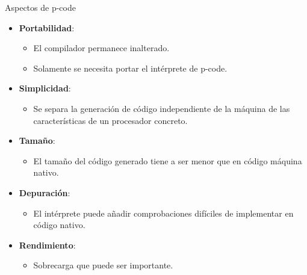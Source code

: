 \begin{frame}[t]{Aspectos de p-code}
  \begin{itemize}
    \item \textbf{\color{blue}Portabilidad}:
      \begin{itemize}
        \item El compilador permanece inalterado.
        \item Solamente se necesita portar el intérprete de p-code.
      \end{itemize}
    \item \textbf{\color{blue}Simplicidad}:
      \begin{itemize}
        \item Se separa la generación de código independiente de la máquina de las características de un procesador concreto.
      \end{itemize}
    \item \textbf{\color{blue}Tamaño}:
      \begin{itemize}
        \item El tamaño del código generado tiene a ser menor que en código máquina nativo.
      \end{itemize}
    \item \textbf{\color{blue}Depuración}:
      \begin{itemize}
        \item El intérprete puede añadir comprobaciones difíciles de implementar en código nativo.
      \end{itemize}
    \item \textbf{\color{blue}Rendimiento}:
      \begin{itemize}
        \item Sobrecarga que puede ser importante.
      \end{itemize}
  \end{itemize}
\end{frame}

